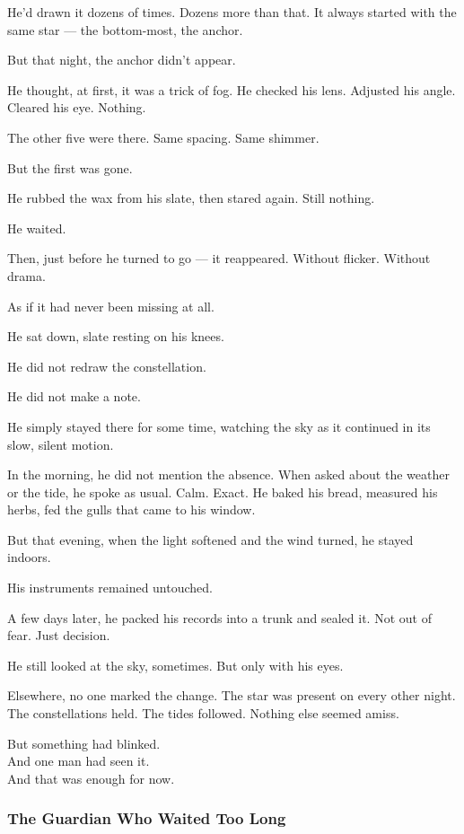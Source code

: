 \documentclass[12pt]{article}
\begin{document}
He’d drawn it dozens of times. Dozens more than that. It always started with the same star — the bottom-most, the anchor.

But that night, the anchor didn’t appear.

He thought, at first, it was a trick of fog. He checked his lens. Adjusted his angle. Cleared his eye. Nothing.

The other five were there. Same spacing. Same shimmer.

But the first was gone.

He rubbed the wax from his slate, then stared again. Still nothing.

He waited.

Then, just before he turned to go — it reappeared. Without flicker. Without drama.

As if it had never been missing at all.

He sat down, slate resting on his knees.

He did not redraw the constellation.

He did not make a note.

He simply stayed there for some time, watching the sky as it continued in its slow, silent motion.

In the morning, he did not mention the absence. When asked about the weather or the tide, he spoke as usual. Calm. Exact. He baked his bread, measured his herbs, fed the gulls that came to his window.

But that evening, when the light softened and the wind turned, he stayed indoors.

His instruments remained untouched.

A few days later, he packed his records into a trunk and sealed it. Not out of fear. Just decision.

He still looked at the sky, sometimes. But only with his eyes.

Elsewhere, no one marked the change. The star was present on every other night. The constellations held. The tides followed. Nothing else seemed amiss.

But something had blinked.\\
And one man had seen it.\\
And that was enough for now.


\dotfill

\subsubsection{The Guardian Who Waited Too Long}
\end{document}

